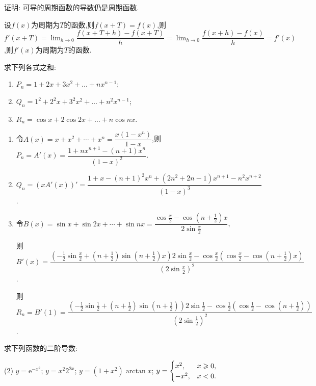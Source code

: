 \begin{exercise}[3.1.16]
    证明: 可导的周期函数的导数仍是周期函数.
\end{exercise}

\begin{solution}
    设$f(x)$为周期为$T$的函数,则$f(x+T) = f(x)$,则$f'(x+T) = \lim_{h \to 0} \dfrac{f(x+T+h) - f(x+T)}{h} = \lim_{h \to 0} \dfrac{f(x+h) - f(x)}{h} = f'(x)$,则$f'(x)$为周期为$T$的函数.
\end{solution}

\begin{exercise}[3.1.17]
    求下列各式之和:
    \begin{enumerate}
        \item $P_n=1+2x+3x^2+\dots+nx^{n-1}$;
        \item $Q_n=1^2+2^2x+3^2x^2+\dots+n^2x^{n-1}$;
        \item $R_n = \cos x + 2\cos 2x + \dots + n\cos nx$.
    \end{enumerate}
\end{exercise}

\begin{solution}
    \begin{enumerate}
        \item 令$A(x) = x + x^2 + \cdots + x^n = \dfrac{x(1-x^n)}{1-x}$,则$P_n = A'(x) = \dfrac{1 + nx^{n+1} -(n+1) x^n}{(1-x)^2}$.
        \item $Q_n = \left( x A'(x) \right)' = \dfrac{1 + x - (n+1)^2 x^n +(2n^2 +2n -1) x^{n+1} - n^2 x^{n+2}}{(1-x)^3}$.
        \item 令$B(x) = \sin x + \sin 2x + \cdots + \sin nx = \dfrac{\cos \frac{x}{2} - \cos \left( n + \frac{1}{2} \right) x}{2 \sin \frac{x}{2}}$,

              则$B'(x) = \dfrac{\left( -\frac12 \sin \frac{x}2 + \left( n + \frac12 \right) \sin \left( n + \frac12 \right) x \right) 2 \sin \frac{x}{2} - \cos \frac{x}{2} \left( \cos \frac{x}{2} - \cos \left( n + \frac12 \right) x \right)}{\left(2 \sin \frac{x}{2} \right)^2}$.

              则$R_n = B'(1) = \dfrac{\left( -\frac12 \sin \frac{1}2 + \left( n + \frac12 \right) \sin \left( n + \frac12 \right) \right) 2 \sin \frac{1}{2} - \cos \frac{1}{2} \left( \cos \frac{1}{2} - \cos \left( n + \frac12 \right) \right)}{\left(2 \sin \frac{1}{2} \right)^2}$.
    \end{enumerate}
\end{solution}

\begin{exercise}[3.1.18]
    求下列函数的二阶导数:
    \begin{tasks}[label=(\arabic*)](2)
        \task $y = \mathrm{e}^{-x^2}$;
        \task $y = x^2 2^{2x}$;
        \task $y = (1+x^2)\arctan x$;
        \task $y = \begin{cases} x^2, & x \geqslant 0, \\ -x^2, & x < 0. \end{cases}$
    \end{tasks}
\end{exercise}

